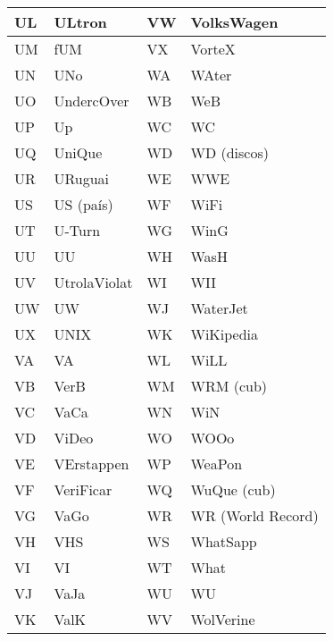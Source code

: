 \begin{table}[h]
    \centering
    \begin{tabular}{|l|l|l|l|}
    \hline
    UL & ULtron               & VW & VolksWagen        \\ \hline
    UM & fUM                  & VX & VorteX            \\ \hline
    UN & UNo                  & WA & WAter             \\ \hline
    UO & UndercOver           & WB & WeB               \\ \hline
    UP & Up                   & WC & WC                \\ \hline
    UQ & UniQue               & WD & WD (discos)       \\ \hline
    UR & URuguai              & WE & WWE               \\ \hline
    US & US (país)            & WF & WiFi              \\ \hline
    UT & U-Turn               & WG & WinG              \\ \hline
    UU & UU                   & WH & WasH              \\ \hline
    UV & UtrolaViolat         & WI & WII               \\ \hline
    UW & UW                   & WJ & WaterJet          \\ \hline
    UX & UNIX                 & WK & WiKipedia         \\ \hline
    VA & VA                   & WL & WiLL              \\ \hline
    VB & VerB                 & WM & WRM (cub)         \\ \hline
    VC & VaCa                 & WN & WiN               \\ \hline
    VD & ViDeo                & WO & WOOo              \\ \hline
    VE & VErstappen           & WP & WeaPon            \\ \hline
    VF & VeriFicar            & WQ & WuQue (cub)       \\ \hline
    VG & VaGo                 & WR & WR (World Record) \\ \hline
    VH & VHS                  & WS & WhatSapp          \\ \hline
    VI & VI                   & WT & What              \\ \hline
    VJ & VaJa                 & WU & WU                \\ \hline
    VK & ValK                 & WV & WolVerine         \\ \hline

\end{tabular}
\end{table}
